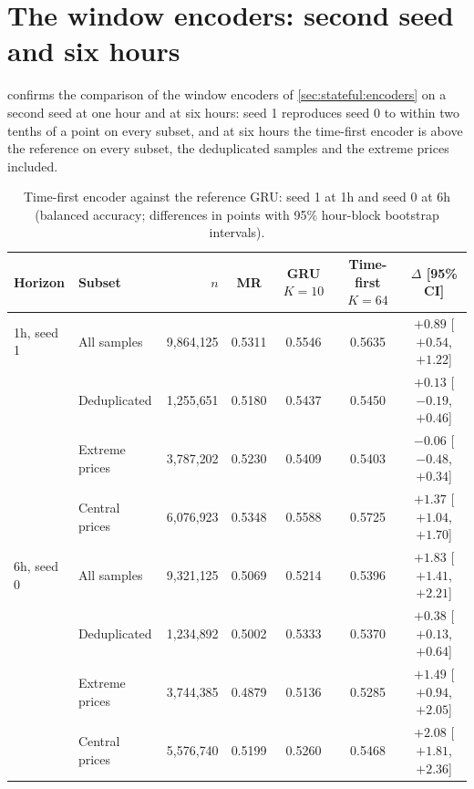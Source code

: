 \section{The window encoders: second seed and six hours}
\label{app:results:encoders}

 confirms the comparison of the window encoders of
\cref{sec:stateful:encoders} on a second seed at one hour and at six hours: seed 1
reproduces seed 0 to within two tenths of a point on every subset, and at six hours the
time-first encoder is above the reference on every subset, the deduplicated samples and
the extreme prices included.

\begin{table}[t]
\centering
\caption{Time-first encoder against the reference GRU: seed 1 at 1h and seed 0 at 6h
(balanced accuracy; differences in points with 95\% hour-block bootstrap intervals).}
\label{tab:exp:encoders:more}
\small
\begin{fittable}\begin{tabular}{llrcccc}
\toprule
Horizon & Subset & $n$ & MR & GRU $K{=}10$ & Time-first $K{=}64$ & $\Delta$ [95\% CI] \\
\midrule
1h, seed 1 & All samples    & 9{,}864{,}125 & 0.5311 & 0.5546 & 0.5635 & $+0.89$ [$+0.54$, $+1.22$] \\
           & Deduplicated   & 1{,}255{,}651 & 0.5180 & 0.5437 & 0.5450 & $+0.13$ [$-0.19$, $+0.46$] \\
           & Extreme prices & 3{,}787{,}202 & 0.5230 & 0.5409 & 0.5403 & $-0.06$ [$-0.48$, $+0.34$] \\
           & Central prices & 6{,}076{,}923 & 0.5348 & 0.5588 & 0.5725 & $+1.37$ [$+1.04$, $+1.70$] \\
\midrule
6h, seed 0 & All samples    & 9{,}321{,}125 & 0.5069 & 0.5214 & 0.5396 & $+1.83$ [$+1.41$, $+2.21$] \\
           & Deduplicated   & 1{,}234{,}892 & 0.5002 & 0.5333 & 0.5370 & $+0.38$ [$+0.13$, $+0.64$] \\
           & Extreme prices & 3{,}744{,}385 & 0.4879 & 0.5136 & 0.5285 & $+1.49$ [$+0.94$, $+2.05$] \\
           & Central prices & 5{,}576{,}740 & 0.5199 & 0.5260 & 0.5468 & $+2.08$ [$+1.81$, $+2.36$] \\
\bottomrule
\end{tabular}\end{fittable}
\end{table}

